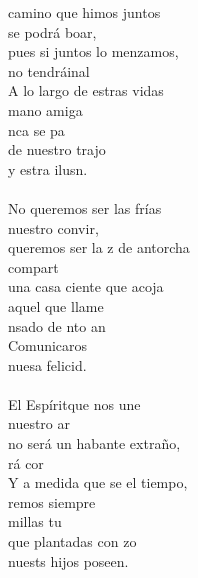\begin{cancion}%
	 camino que himos juntos\\
	 se podrá boar,\\
	pues si juntos lo menzamos,\\
	 no tendráinal\\
	A lo largo de estras vidas\\
	 mano amiga\\
	nca se pa\\
	de nuestro trajo\\
	y estra ilusn. \\
\jump\\
	No queremos ser las frías\\
	 nuestro convir,\\
	queremos ser la z de antorcha\\
	 compart  \\
	una casa ciente que acoja\\
	aquel que llame\\
	nsado de nto an\\
	Comunicaros\\
	nuesa felicid.\\
\jump\\
	El Espíritque nos une\\
	 nuestro ar\\
	no será un habante extraño,\\
	rá cor\\
	Y a medida que se el tiempo,\\
	remos siempre\\
	millas  tu \\
	que plantadas con zo\\
	nuests hijos poseen. \\
\end{cancion}%
